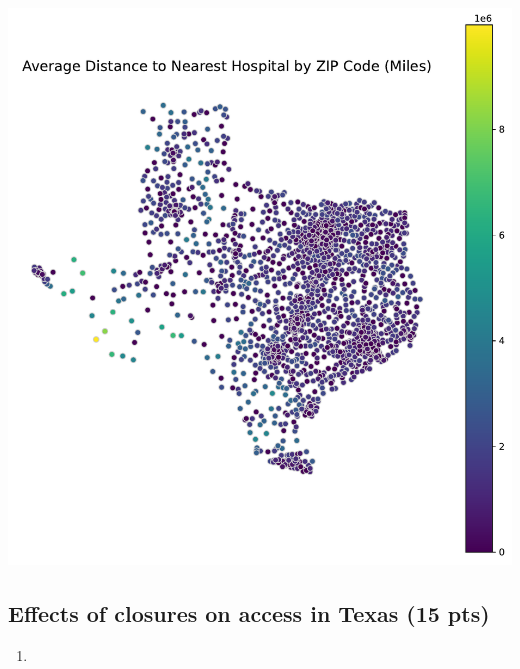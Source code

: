 \documentclass[
  letterpaper,
  DIV=11,
  numbers=noendperiod]{scrartcl}
\providecommand{\tightlist}{%
  \setlength{\itemsep}{0pt}\setlength{\parskip}{0pt}}\usepackage{longtable,booktabs,array}
\begin{document}
\includegraphics{pset4_ANSWERS_files/figure-pdf/cell-23-output-1.pdf}

\subsection{Effects of closures on access in Texas (15
pts)}\label{effects-of-closures-on-access-in-texas-15-pts}

\begin{enumerate}
\def\labelenumi{\arabic{enumi}.}
\tightlist
\item
\end{enumerate}
\end{document}
